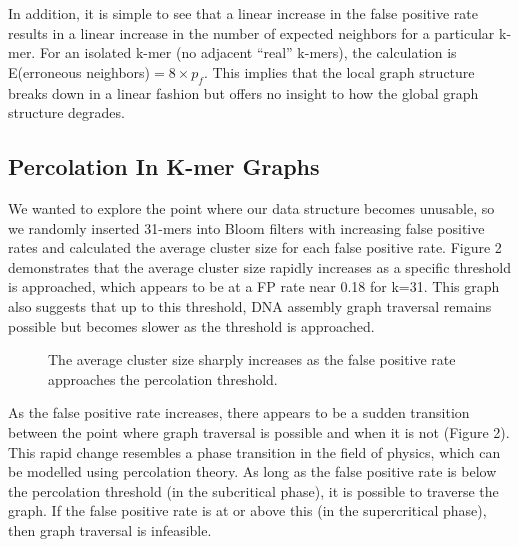 \documentclass[12pt]{article} \usepackage{simplemargins}
\begin{document}
In addition, it is simple to see that a linear increase in the false 
positive rate results in a linear increase in the number of expected 
neighbors for a particular k-mer. For an isolated k-mer (no adjacent 
``real'' k-mers), the calculation is 
E(erroneous neighbors)$ = 8 \times p_f$. This implies that the local graph 
structure breaks down in a linear fashion but offers no insight 
to how the global graph structure degrades.

\subsection{Percolation In K-mer Graphs}
We wanted to explore the point where our data structure becomes unusable, 
so we randomly inserted 31-mers into Bloom
filters with increasing false positive rates and calculated the average
cluster size for each false positive rate. Figure 2 demonstrates that 
the average cluster
size rapidly increases as a specific threshold is approached,
which appears to be at a FP rate near 0.18 for k=31. This
graph also suggests that up to this threshold, DNA assembly graph 
traversal remains possible but becomes slower as the threshold is
approached.

\begin{figure}
\caption{The average cluster size sharply increases as the false positive 
rate approaches the percolation threshold.
}
\end{figure}

As the false positive rate increases, there appears to be a sudden
transition between the point where graph traversal is possible and
when it is not (Figure 2). This rapid change resembles a phase transition in the
field of physics, which can be modelled using percolation theory. As
long as the false positive rate is below the percolation threshold (in
the subcritical phase), it is possible to traverse the graph. If the
false positive rate is at or above this (in the supercritical phase), then graph
traversal is infeasible.
\end{document}
